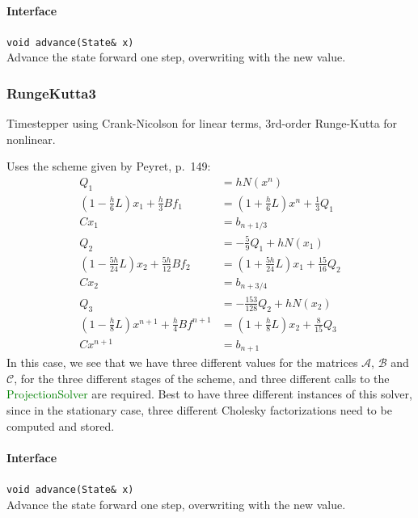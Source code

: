 \documentclass[11pt]{article}
\def\class#1{\textcolor{green}{\ttfamily\small #1}} %
\let\code\lstinline
\begin{document}
\paragraph{Interface}
\begin{description}
	\item \code|void advance(State& x)|\\
		Advance the state forward one step, overwriting with the new value.
\end{description}
		
\subsubsection{RungeKutta3}
Timestepper using Crank-Nicolson for linear terms, 3rd-order Runge-Kutta for nonlinear.

Uses the scheme given by Peyret, p.~149\cite{Peyret:2002}:
\begin{align}
	Q_1 &= hN(x^n)\\
	(1-\frac{h}{6}L)x_1 + \frac{h}{3}Bf_1 &= (1+\frac{h}{6}L)x^n + \frac{1}{3}Q_1\\
	Cx_1 &= b_{n+1/3}\\
	Q_2 &= -\frac{5}{9} Q_1 + hN(x_1)\\
	(1-\frac{5h}{24}L)x_2 + \frac{5h}{12}Bf_2 &= (1+\frac{5h}{24}L)x_1 + \frac{15}{16}Q_2\\
	Cx_2 &= b_{n+3/4}\\
	Q_3 &= -\frac{153}{128} Q_2 + hN(x_2)\\
	(1-\frac{h}{8}L)x^{n+1} + \frac{h}{4}Bf^{n+1} &= (1+\frac{h}{8}L)x_2 + \frac{8}{15}Q_3\\
	Cx^{n+1} &= b_{n+1}
\end{align}
In this case, we see that we have three different values for the matrices $\mathcal{A}$, $\mathcal{B}$ and $\mathcal{C}$, for the three different stages of the scheme, and three different calls to the \class{ProjectionSolver} are required.  Best to have three different instances of this solver, since in the stationary case, three different Cholesky factorizations need to be computed and stored.

\paragraph{Interface}
\begin{description}
	\item \code|void advance(State& x)|\\
		Advance the state forward one step, overwriting with the new value.
\end{description}
		
\end{document}
